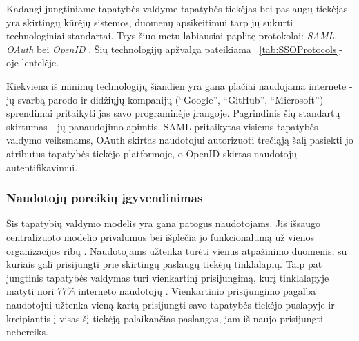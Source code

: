 
Kadangi jungtiniame tapatybės valdyme tapatybės tiekėjas bei paslaugų tiekėjas yra skirtingų kūrėjų sistemos,
duomenų apsikeitimui tarp jų sukurti technologiniai standartai. Trys šiuo metu labiausiai paplitę protokolai: \textit{SAML}, \textit{OAuth} bei \textit{OpenID}
\cite{OIDvsOAuthvsSAML}. Šių technologijų
apžvalga pateikiama ~\ref{tab:SSOProtocols}-oje lentelėje.



Kiekviena iš minimų technologijų šiandien yra gana plačiai naudojama internete - jų svarbą parodo
ir didžiųjų kompanijų (\enquote{Google}, \enquote{GitHub}, \enquote{Microsoft}) sprendimai pritaikyti jas savo
programinėje įrangoje. Pagrindinis šių standartų skirtumas - jų panaudojimo apimtis. SAML pritaikytas visiems tapatybės valdymo
veiksmams, OAuth skirtas naudotojui autorizuoti trečiąją šalį pasiekti jo atributus tapatybės tiekėjo platformoje,
o OpenID skirtas naudotojų autentifikavimui.

\subsubsection*{Naudotojų poreikių įgyvendinimas}

Šis tapatybių valdymo modelis yra gana patogus naudotojams. Jis išsaugo centralizuoto modelio privalumus 
bei išplečia jo funkcionalumą už vienos organizacijos ribų \cite{OIDvsOAuthvsSAML}. Naudotojams užtenka turėti vienus atpažinimo duomenis, su kuriais
gali prisijungti prie skirtingų paslaugų tiekėjų tinklalapių. Taip pat jungtinis tapatybės valdymas turi vienkartinį prisijungimą,
kurį tinklalapyje matyti nori 77\% interneto naudotojų \cite{SSOResearch}. Vienkartinio prisijungimo pagalba naudotojui užtenka vieną kartą
prisijungti savo tapatybės tiekėjo puslapyje ir kreipiantis į visas šį tiekėją palaikančias paslaugas, jam iš naujo prisijungti nebereiks.

